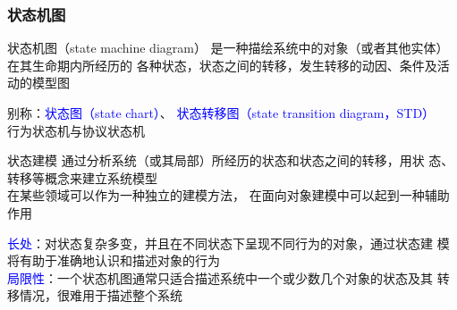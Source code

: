 \documentclass[compress]{beamer}
\begin{document}
\begin{frame}
  \frametitle{状态机图}
   {
  \begin{block}{状态机图（state machine diagram）}
    是一种描绘系统中的对象（或者其他实体）在其生命期内所经历的
    各种状态，状态之间的转移，发生转移的动因、条件及活动的模型图 \\
  \end{block}

    别称：\textcolor{blue}{状态图（state chart）}、
    \textcolor{blue}{状态转移图（state transition diagram，STD）} \\

    行为状态机与协议状态机
  }

   {
    \begin{block}{状态建模}
      通过分析系统（或其局部）所经历的状态和状态之间的转移，用状
    态、转移等概念来建立系统模型 \\
    在某些领域可以作为一种独立的建模方法，
    在面向对象建模中可以起到一种辅助作用
  \end{block}

  \textcolor{blue}{长处}：对状态复杂多变，并且在不同状态下呈现不同行为的对象，通过状态建
    模将有助于准确地认识和描述对象的行为  \\

    \textcolor{blue}{局限性}：一个状态机图通常只适合描述系统中一个或少数几个对象的状态及其
    转移情况，很难用于描述整个系统
  }
  \end{frame}
\end{document}
